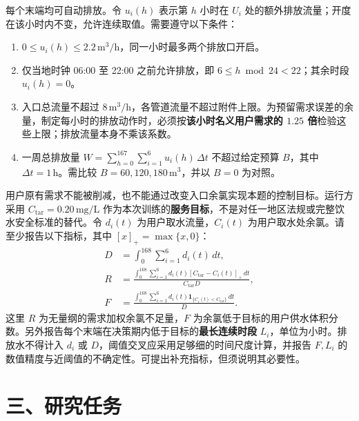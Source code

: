 \documentclass[11pt,a4paper]{article}
\newcommand{\Cstar}{C_{\mathrm{tar}}}
\begin{document}
每个末端均可自动排放。令 $u_i(h)$ 表示第 $h$ 小时在 $U_i$ 处的额外排放流量；开度在该小时内不变，允许连续取值。需要遵守以下条件：
\begin{enumerate}
\item $0\leq u_i(h)\leq2.2\,\mathrm{m^3/h}$，同一小时最多两个排放口开启。
\item 仅当地时钟 06:00 至 22:00 之前允许排放，即 $6\leq h\bmod24<22$；其余时段 $u_i(h)=0$。
\item 入口总流量不超过 $8\,\mathrm{m^3/h}$，各管道流量不超过附件上限。为预留需求误差的余量，制定每小时的排放动作时，必须按\textbf{该小时名义用户需求的 $1.25$ 倍}检验这些上限；排放流量本身不乘该系数。
\item 一周总排放量 $W=\sum_{h=0}^{167}\sum_{i=1}^{6}u_i(h)\,\Delta t$ 不超过给定预算 $B$，其中 $\Delta t=1\,\mathrm{h}$。需比较 $B=60,120,180\,\mathrm{m^3}$，并以 $B=0$ 为对照。
\end{enumerate}

用户原有需求不能被削减，也不能通过改变入口余氯实现本题的控制目标。运行方采用 $\Cstar=0.20\,\mathrm{mg/L}$ 作为本次训练的\textbf{服务目标}，不是对任一地区法规或完整饮水安全标准的替代。令 $d_i(t)$ 为用户取水流量，$C_i(t)$ 为用户取水处余氯。请至少报告以下指标，其中 $[x]_+=\max\{x,0\}$：
\begin{align*}
 D&=\int_0^{168}\sum_{i=1}^{6}d_i(t)\,dt,\\
 R&=\frac{\displaystyle\int_0^{168}\sum_{i=1}^{6}
 d_i(t)[\Cstar-C_i(t)]_+\,dt}{\Cstar D},\\
 F&=\frac{\displaystyle\int_0^{168}\sum_{i=1}^{6}
 d_i(t)\mathbf{1}_{\{C_i(t)<\Cstar\}}\,dt}{D}.
\end{align*}
这里 $R$ 为无量纲的需求加权余氯不足量，$F$ 为余氯低于目标的用户供水体积分数。另外报告每个末端在决策期内低于目标的\textbf{最长连续时段} $L_i$，单位为小时。排放水不得计入 $d_i$ 或 $D$，阈值交叉应采用足够细的时间尺度计算，并报告 $F,L_i$ 的数值精度与近阈值的不确定性。可提出补充指标，但须说明其必要性。

\newpage
\section*{三、研究任务}
\end{document}
